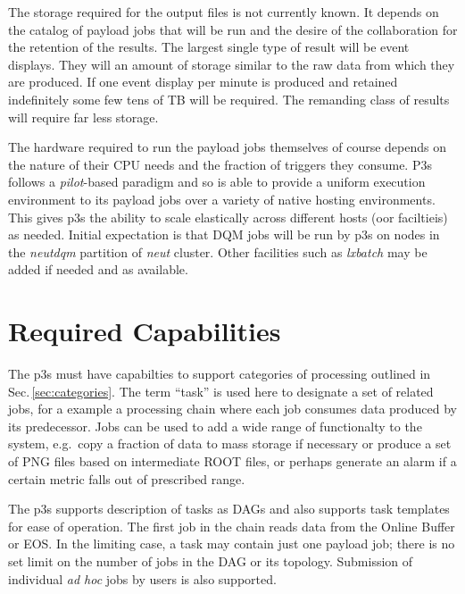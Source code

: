 \documentclass[pdftex,12pt,letter]{article}
\begin{document}
The storage required for the output files is not currently known.  It
depends on the catalog of payload jobs that will be run and the desire
of the collaboration for the retention of the results.  The largest
single type of result will be event displays.  They will an amount of
storage similar to the raw data from which they are produced.  If one
event display per minute is produced and retained indefinitely some
few tens of TB will be required.  The remanding class of results will
require far less storage.

The hardware required to run the payload jobs themselves of course
depends on the nature of their CPU needs and the fraction of triggers
they consume.  P3s follows a \textit{pilot}-based paradigm and so is
able to provide a uniform execution environment to its payload jobs
over a variety of native hosting environments.  This gives p3s the ability
to scale elastically across different hosts (oor faciltieis) as needed.  Initial expectation
is that DQM jobs will be run by p3s on nodes in the \textit{neutdqm}
partition of \textit{neut} cluster.  Other facilities such as
\textit{lxbatch} \cite{lxbatch} may be added if needed and as available.


\section{Required Capabilities}
\label{sec:capabilities}

The p3s must have capabilties to support categories of processing outlined
in Sec.\,\ref{sec:categories}. The term ``task'' is used here to designate a set
of related jobs, for a example a processing chain where each job consumes
data produced by its predecessor. Jobs can be used to add a wide range
of functionalty to the system, e.g.~copy a fraction of data to mass storage
if necessary or produce a set of PNG files based on intermediate ROOT files,
or perhaps generate an alarm if a certain metric falls out of prescribed range.

The p3s supports description of tasks as DAGs and also supports task templates
for ease of operation. The first job in the chain reads data from
the Online Buffer or EOS. In the limiting case, a task may contain just one payload
job; there is no set limit on the number of jobs in the DAG or its topology.
Submission of individual \textit{ad hoc} jobs by users is also supported.
\end{document}
